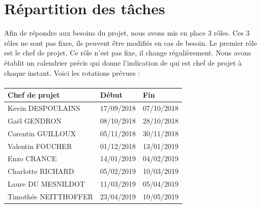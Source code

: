 \section{Répartition des tâches}

Afin de répondre aux besoins du projet, nous avons mis en place 3 rôles. Ces 3 rôles ne sont pas fixes,
ils peuvent être modifiés en cas de besoin. Le premier rôle est le chef de projet. Ce rôle n’est pas fixe,
il change régulièrement. Nous avons établit un calendrier précis qui donne l’indication de qui
est chef de projet à chaque instant. Voici les rotations prévues :

\paragraph{}
\begin{tabular}{ | l | l | l | }
\hline
{\textbf{Chef de projet}}   &   {\textbf{Début}}    &   {\textbf{Fin}}  \\ \hline
{Kevin DESPOULAINS}         &   {17/09/2018}        &	{07/10/2018}    \\ \hline
{Gaël GENDRON}              &   {08/10/2018}	    &	{28/10/2018}    \\ \hline
{Corentin GUILLOUX}         &   {05/11/2018}	    &	{30/11/2018}    \\ \hline
{Valentin FOUCHER}          &   {01/12/2018}	    &	{13/01/2019}    \\ \hline
{Enzo CRANCE}               &   {14/01/2019}	    &	{04/02/2019}    \\ \hline
{Charlotte RICHARD}         &   {05/02/2019}	    &	{10/03/2019}    \\ \hline
{Laure DU MESNILDOT}        &   {11/03/2019}	    &	{05/04/2019}    \\ \hline
{Timothée NEITTHOFFER}      &	{23/04/2019}	    &	{10/05/2019}    \\ \hline
\end{tabular}
    
